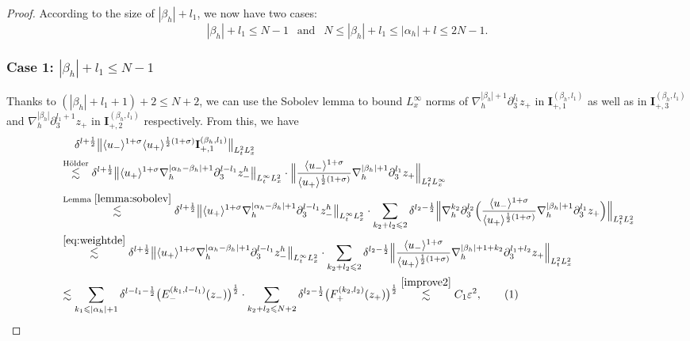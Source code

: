 \documentclass[10pt,reqno]{amsart}
\numberwithin{equation}{section}
\begin{document}
\begin{proof}
 
According to the size of $|\beta_h|+l_1$, we now have  two cases:
\[|\beta_h|+l_1\leqslant N-1\ \ \text{ and }\ \ N\leqslant|\beta_h|+l_1\leqslant  |\alpha_h|+l\leqslant 2N-1.\]
\subsubsection*{\bf Case 1:  $|\beta_h|+l_1\leqslant N-1$} Thanks to  $(|\beta_h|+l_1+1)+2\leqslant N+2$, we can use the Sobolev lemma to bound  $L^\infty_x$ norms of $\nabla_h^{|\beta_h|+1}\partial_3^{l_1} z_{+}$ in $\mathbf{I}_{+,1}^{(\beta_h,l_1)}$ as well as in  $\mathbf{I}_{+,3}^{(\beta_h,l_1)}$ and $\nabla_h^{|\beta_h|}\partial_3^{l_1+1} z_{+}$ in $\mathbf{I}_{+,2}^{(\beta_h,l_1)}$ respectively. From this, we have 
\begin{align*}
	&\ \ \ \ \delta^{l+\frac{1}{2}}\big\|\langle u_-\rangle^{1+\sigma}\langle u_+\rangle^{\frac{1}{2}(1+\sigma)}\mathbf{I}_{+,1}^{(\beta_h,l_1)}\big\|_{L^2_tL^2_x}\\
	&\stackrel{\text{H\"older}}{\lesssim} \delta^{l+\frac{1}{2}}\big\|\langle u_+\rangle^{1+\sigma}\nabla_h^{|\alpha_h-\beta_h|+1}\partial_3^{l-l_1}z_-^h\big\|_{L^\infty_tL^2_x}\cdot\Big\|\frac{\langle u_-\rangle^{1+\sigma}}{\langle u_+\rangle^{\frac{1}{2}(1+\sigma)}}\nabla_h^{|\beta_h|+1}\partial_3^{l_1}z_+\Big\|_{L^2_tL^\infty_x}\\
	&\stackrel{\text{Lemma } \ref{lemma:sobolev}}{\lesssim}\delta^{l+\frac{1}{2}}\big\|\langle u_+\rangle^{1+\sigma}\nabla_h^{|\alpha_h-\beta_h|+1}\partial_3^{l-l_1}z_-^h\big\|_{L^\infty_tL^2_x}\cdot \sum_{k_2+l_2\leqslant 2}\delta^{l_2-\frac{1}{2}}\Big\|\nabla_h^{k_2}\partial_3^{l_2}\Big(\frac{\langle u_-\rangle^{1+\sigma}}{\langle u_+\rangle^{\frac{1}{2}(1+\sigma)}}\nabla_h^{|\beta_h|+1}\partial_3^{l_1}z_+\Big)\Big\|_{L^2_tL^2_x} \\
	&\stackrel{\eqref{eq:weightde}}{\lesssim}\delta^{l+\frac{1}{2}}\big\|\langle u_+\rangle^{1+\sigma}\nabla_h^{|\alpha_h-\beta_h|+1}\partial_3^{l-l_1}z_-^h\big\|_{L^\infty_tL^2_x}\cdot  \sum_{k_2+l_2\leqslant 2}\delta^{l_2-\frac{1}{2}} \Big\|\frac{\langle u_-\rangle^{1+\sigma}}{\langle u_+\rangle^{\frac{1}{2}(1+\sigma)}}\nabla_h^{|\beta_h|+1+k_2}\partial_3^{l_1+l_2}z_+\Big\|_{L^2_tL^2_x}\\
	&\lesssim\sum_{k_1\leqslant|\alpha_h|+1}\delta^{l-l_1-\frac{1}{2}}\big(E_-^{(k_1,l-l_1)}(z_-)\big)^{\frac{1}{2}}\cdot\sum_{k_2+l_2\leqslant N+2}\delta^{l_2-\frac{1}{2}}\big(F_+^{(k_2,l_2)}(z_+)\big)^{\frac{1}{2}}
	\stackrel{\eqref{improve2}}{\lesssim} C_1\varepsilon^2,\stepcounter{equation}\tag{\theequation}\label{eqA5}\\

\end{align*}
\end{proof}
\end{document}
